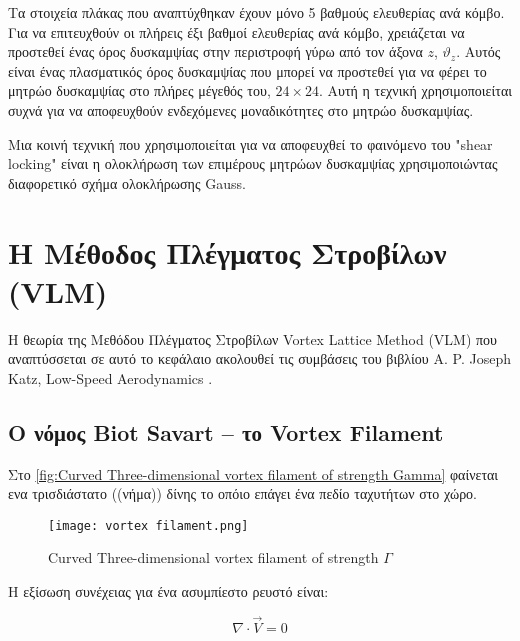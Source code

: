 Τα στοιχεία πλάκας που αναπτύχθηκαν έχουν μόνο 5 βαθμούς ελευθερίας ανά κόμβο. Για να επιτευχθούν οι πλήρεις έξι βαθμοί ελευθερίας ανά κόμβο, χρειάζεται να προστεθεί ένας όρος δυσκαμψίας στην περιστροφή γύρω από τον άξονα $z$, $\vartheta_{z}$. Αυτός είναι ένας πλασματικός όρος δυσκαμψίας που μπορεί να προστεθεί για να φέρει το μητρώο δυσκαμψίας στο πλήρες μέγεθός του, $24 \times 24$. Αυτή η τεχνική χρησιμοποιείται συχνά για να αποφευχθούν ενδεχόμενες μοναδικότητες στο μητρώο δυσκαμψίας.

Μια κοινή τεχνική που χρησιμοποιείται για να αποφευχθεί το φαινόμενο του  \textlatin{"shear locking"} είναι η ολοκλήρωση των επιμέρους μητρώων δυσκαμψίας χρησιμοποιώντας διαφορετικό σχήμα ολοκλήρωσης \textlatin{Gauss}.


\section{Η Μέθοδος Πλέγματος Στροβίλων \textlatin{(VLM)}}
\label{aerodynamic-theory-vortex-lattice-method-vlm}

Η θεωρία της Μεθόδου Πλέγματος Στροβίλων \textlatin{Vortex Lattice Method (VLM)} που αναπτύσσεται σε αυτό το κεφάλαιο ακολουθεί τις συμβάσεις του βιβλίου \textlatin{A. P. Joseph Katz, Low-Speed Aerodynamics} \cite{katz2001}.

\subsection{Ο νόμος \textlatin{Biot Savart} -- το \textlatin{Vortex Filament}}
\label{the-vortex-filament-biot-savart-law}

Στο \autoref{fig:Curved Three-dimensional vortex filament of strength Gamma} φαίνεται ενα τρισδιάστατο ((νήμα)) δίνης το οπόιο επάγει ένα πεδίο ταχυτήτων στο χώρο. 

\begin{figure}[H]
    \centering
    \texttt{[image: vortex filament.png]}
    \caption{\textlatin{Curved Three-dimensional vortex filament of strength $\Gamma$ \cite{pinzon2015}}}
    \label{fig:Curved Three-dimensional vortex filament of strength Gamma}
\end{figure}


Η εξίσωση συνέχειας για ένα ασυμπίεστο ρευστό είναι:

\begin{equation}
\nabla \cdot \vec{V} = 0
\end{equation}

